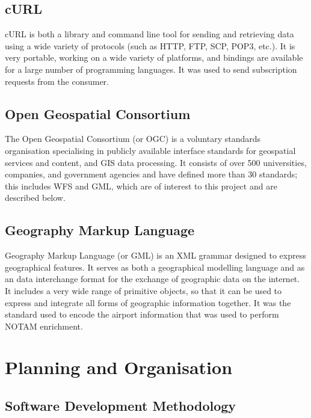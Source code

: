 \documentclass[a4paper, 12pt, twoside]{article}
\begin{document}
\subsection{cURL}
\label{sec:bg_curl}

cURL is both a library and command line tool for sending and retrieving data using a wide variety of protocols (such as HTTP, FTP, SCP, POP3, etc.). It is very portable, working on a wide variety of platforms, and bindings are available for a large number of programming languages. It was used to send subscription requests from the consumer.

\subsection{Open Geospatial Consortium}
\label{sec:bg_ogc}

The Open Geospatial Consortium (or OGC) is a voluntary standards organisation specialising in publicly available interface standards for geospatial services and content, and GIS data processing. It consists of over 500 universities, companies, and government agencies and have defined more than 30 standards; this includes WFS and GML, which are of interest to this project and are described below.

\subsection{Geography Markup Language}
\label{sec:bg_gml}

Geography Markup Language (or GML) is an XML grammar designed to express geographical features. It serves as both a geographical modelling language and as an data interchange format for the exchange of geographic data on the internet. It includes a very wide range of primitive objects, so that it can be used to express and integrate all forms of geographic information together. It was the standard used to encode the airport information that was used to perform NOTAM enrichment.

\newpage

\section{Planning and Organisation}
\label{sec:planning}

\subsection{Software Development Methodology}
\label{sec:plan_software_development_methodology}
\end{document}
